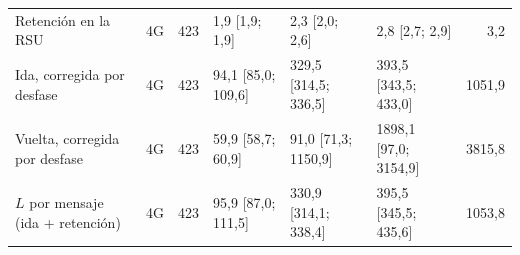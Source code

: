 \begin{table}[H]
\begin{tabular}{llrlllr}
Retención en la RSU & 4G & 423 & 1,9 [1,9; 1,9] & 2,3 [2,0; 2,6] & 2,8 [2,7; 2,9] & 3,2 \\
Ida, corregida por desfase & 4G & 423 & 94,1 [85,0; 109,6] & 329,5 [314,5; 336,5] & 393,5 [343,5; 433,0] & 1051,9 \\
Vuelta, corregida por desfase & 4G & 423 & 59,9 [58,7; 60,9] & 91,0 [71,3; 1150,9] & 1898,1 [97,0; 3154,9] & 3815,8 \\
$L$ por mensaje (ida + retención) & 4G & 423 & 95,9 [87,0; 111,5] & 330,9 [314,1; 338,4] & 395,5 [345,5; 435,6] & 1053,8 \\
\bottomrule
\end{tabular}
\end{table}
